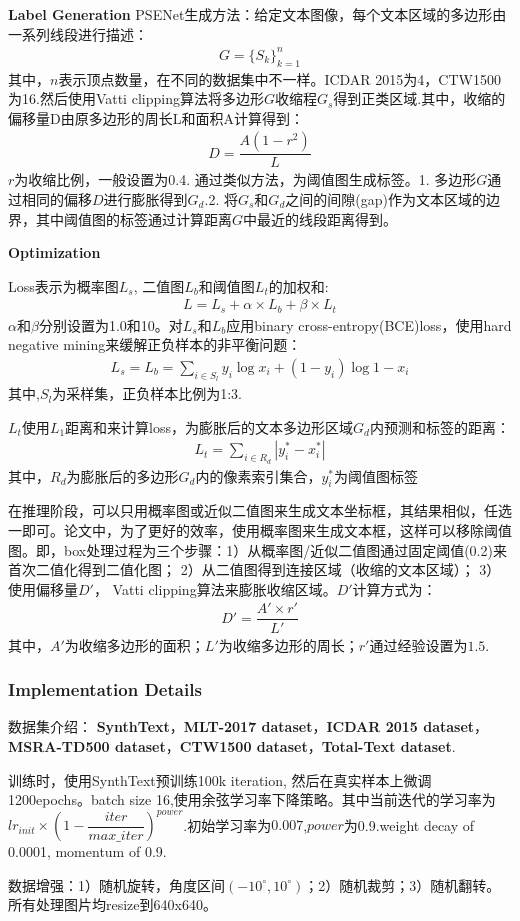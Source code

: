 \documentclass{article}
\begin{document}
\textbf{Label Generation}
PSENet生成方法：给定文本图像，每个文本区域的多边形由一系列线段进行描述：
\begin{align}
G = \{ S_k \}_{k=1}^n
\end{align}
其中，$n$表示顶点数量，在不同的数据集中不一样。ICDAR 2015为4，CTW1500为16.然后使用Vatti clipping算法将多边形$G$收缩程$G_s$得到正类区域.其中，收缩的偏移量D由原多边形的周长L和面积A计算得到：
\begin{align}
D=\dfrac{A(1-r^2)}{L}
\end{align}
$r$为收缩比例，一般设置为0.4. 通过类似方法，为阈值图生成标签。1. 多边形$G$通过相同的偏移$D$进行膨胀得到$G_d$.2. 将$G_s$和$G_d$之间的间隙(gap)作为文本区域的边界，其中阈值图的标签通过计算距离$G$中最近的线段距离得到。

\textbf{Optimization}

Loss表示为概率图$L_s$, 二值图$ L_b $和阈值图$L_t$的加权和:
\begin{align}
L=L_s + \alpha \times L_b + \beta \times L_t
\end{align}
$\alpha$和$\beta$分别设置为1.0和10。对$L_s$和$L_b$应用binary cross-entropy(BCE)loss，使用hard negative mining来缓解正负样本的非平衡问题：
\begin{align}
L_s = L_b = \sum_{i \in S_l}{y_i \log{x_i} + (1 - y_i) \log{1 - x_i}} 
\end{align}
其中,$S_l$为采样集，正负样本比例为1:3.

$L_t$使用$L_1$距离和来计算loss，为膨胀后的文本多边形区域$G_d$内预测和标签的距离：
\begin{align}
L_t = \sum_{i \in R_d}{\left| y_i^* - x_i^* \right|}
\end{align}
其中，$R_d$为膨胀后的多边形$G_d$内的像素索引集合，$y_i^*$为阈值图标签

在推理阶段，可以只用概率图或近似二值图来生成文本坐标框，其结果相似，任选一即可。论文中，为了更好的效率，使用概率图来生成文本框，这样可以移除阈值图。即，box处理过程为三个步骤：1）从概率图/近似二值图通过固定阈值(0.2)来首次二值化得到二值化图； 2）从二值图得到连接区域（收缩的文本区域）； 3）使用偏移量$D'$， Vatti clipping算法来膨胀收缩区域。$D'$计算方式为：
\begin{align}
D' = \dfrac{A' \times r'}{L'}
\end{align}
其中，$A'$为收缩多边形的面积；$L'$为收缩多边形的周长；$r'$通过经验设置为$1.5$.

\subsubsection{Implementation Details}
数据集介绍： \textbf{SynthText}，\textbf{MLT-2017 dataset}，\textbf{ICDAR 2015 dataset}，\textbf{MSRA-TD500 dataset}，\textbf{CTW1500 dataset}，\textbf{Total-Text dataset}.

训练时，使用SynthText预训练100k iteration, 然后在真实样本上微调1200epochs。batch size 16,使用余弦学习率下降策略。其中当前迭代的学习率为$lr_{init} \times (1 - \dfrac{iter}{max\_iter})^{power}$.初始学习率为$0.007$,$power$为0.9.weight decay of 0.0001, momentum of 0.9.

数据增强：1）随机旋转，角度区间$(-10^\circ,10^\circ)$；2）随机裁剪；3）随机翻转。所有处理图片均resize到640x640。



\end{document}
